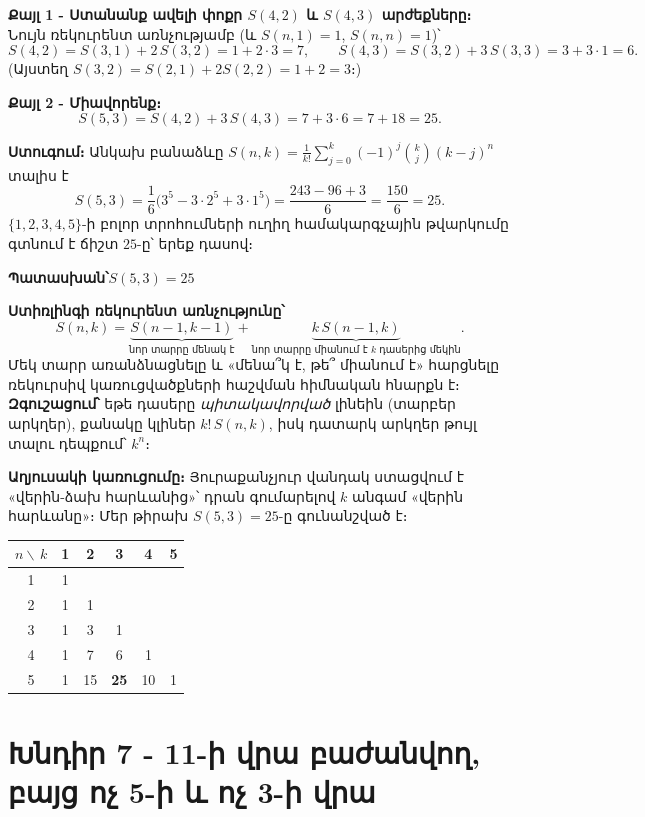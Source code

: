 \documentclass[11pt,a4paper]{article}
\newcommand{\answer}[1]{\begin{answerbox}\centering\textbf{Պատասխան՝}\quad #1\end{answerbox}}
\begin{document}
\textbf{Քայլ 1 - Ստանանք ավելի փոքր $S(4,2)$ և $S(4,3)$ արժեքները։}
Նույն ռեկուրենտ առնչությամբ (և $S(n,1)=1$, $S(n,n)=1$)՝
$$S(4,2)=S(3,1)+2\,S(3,2)=1+2\cdot 3=7,\qquad S(4,3)=S(3,2)+3\,S(3,3)=3+3\cdot1=6.$$
(Այստեղ $S(3,2)=S(2,1)+2S(2,2)=1+2=3$։)

\textbf{Քայլ 2 - Միավորենք։}
$$S(5,3)=S(4,2)+3\,S(4,3)=7+3\cdot 6=7+18=25.$$

\textbf{Ստուգում։} Անկախ բանաձևը
$S(n,k)=\frac{1}{k!}\sum_{j=0}^{k}(-1)^{j}\binom{k}{j}(k-j)^{n}$ տալիս է
$$S(5,3)=\frac{1}{6}\big(3^5-3\cdot 2^5+3\cdot 1^5\big)=\frac{243-96+3}{6}=\frac{150}{6}=25.$$
$\{1,2,3,4,5\}$-ի բոլոր տրոհումների ուղիղ համակարգչային թվարկումը գտնում է ճիշտ $25$-ը՝ երեք դասով։
\checkmark

\answer{$S(5,3)=25$}

\begin{methodbox}
\textbf{Ստիռլինգի ռեկուրենտ առնչությունը՝}
$$S(n,k)=\underbrace{S(n-1,k-1)}_{\text{նոր տարրը մենակ է}}+\underbrace{k\,S(n-1,k)}_{\text{նոր տարրը միանում է $k$ դասերից մեկին}}.$$
Մեկ տարր առանձնացնելը և «մենա՞կ է, թե՞ միանում է» հարցնելը ռեկուրսիվ կառուցվածքների հաշվման
հիմնական հնարքն է։ \textbf{Զգուշացում՝} եթե դասերը \emph{պիտակավորված} լինեին (տարբեր արկղեր),
քանակը կլիներ $k!\,S(n,k)$, իսկ դատարկ արկղեր թույլ տալու դեպքում՝ $k^{n}$։
\end{methodbox}

\medskip
\textbf{Աղյուսակի կառուցումը։} Յուրաքանչյուր վանդակ ստացվում է «վերին-ձախ հարևանից»՝ դրան
գումարելով $k$ անգամ «վերին հարևանը»։ Մեր թիրախ $S(5,3)=25$-ը գունանշված է։

\begin{center}
\small
\renewcommand{\arraystretch}{1.15}
\begin{tabular}{@{}c|ccccc@{}}
\toprule
$n \backslash\, k$ & 1 & 2 & 3 & 4 & 5\\
\midrule
1 & 1 &    &    &   & \\
2 & 1 & 1  &    &   & \\
3 & 1 & 3  & 1  &   & \\
4 & 1 & 7  & 6  & 1 & \\
5 & 1 & 15 & \cellcolor{armOrange!30}\textbf{25} & 10 & 1\\
\bottomrule
\end{tabular}
\end{center}

\section*{Խնդիր 7 - 11-ի վրա բաժանվող, բայց ոչ 5-ի և ոչ 3-ի վրա}
\end{document}
